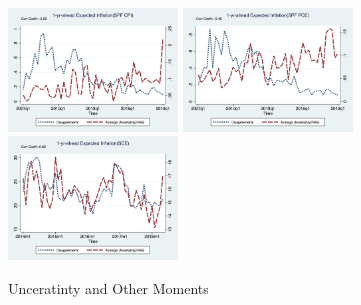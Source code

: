 \documentclass[]{article}
\begin{document}
\begin{figure}[ht]
	\smallskip	
	\includegraphics[width=4.5cm]{figures/CPI_disg_varSPFCPIQ.png}
	\includegraphics[width=4.5cm]{figures/PCE_disg_varSPFPCEQ.png}
	\includegraphics[width=4.5cm]{figures/Q9_disg_varSCEM.png}\\
		\caption{Unceratinty and Other Moments}
		\label{UnceratitnyOtherMoments}
\end{figure}
\end{document}
